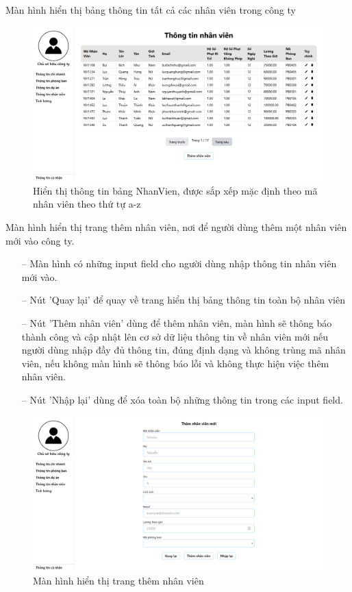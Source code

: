 Màn hình hiển thị bảng thông tin tất cả các nhân viên trong công ty
\begin{figure}[H]
    \centering
    \includegraphics[width=0.75\linewidth]{content/images/ManHinh_1_1.png}
    \caption{Hiển thị thông tin bảng NhanVien, được sắp xếp mặc định theo mã nhân viên theo thứ tự a-z}
    \label{fig:ManHinh_1_1}
\end{figure}

Màn hình hiển thị trang thêm nhân viên, nơi để người dùng thêm một nhân viên mới vào công ty.
\begin{itemize}
    \item [--] Màn hình có những input field cho người dùng nhập thông tin nhân viên mới vào.
    \item [--] Nút 'Quay lại' để quay về trang hiển thị bảng thông tin toàn bộ nhân viên
    \item [--] Nút 'Thêm nhân viên' dùng để thêm nhân viên, màn hình sẽ thông báo thành công và cập nhật lên cơ sở dữ liệu thông tin về nhân viên mới nếu người dùng nhập đầy đủ thông tin, đúng định dạng và không trùng mã nhân viên, nếu không màn hình sẽ thông báo lỗi và không thực hiện việc thêm nhân viên.
    \item [--] Nút 'Nhập lại' dùng để xóa toàn bộ những thông tin trong các input field.
\end{itemize}

\begin{figure}[H]
    \centering
    \includegraphics[width=0.75\linewidth]{content/images/ManHinh_1_a.png}
    \caption{Màn hình hiển thị trang thêm nhân viên}
    \label{fig:ManHinh_1_a}
\end{figure}

